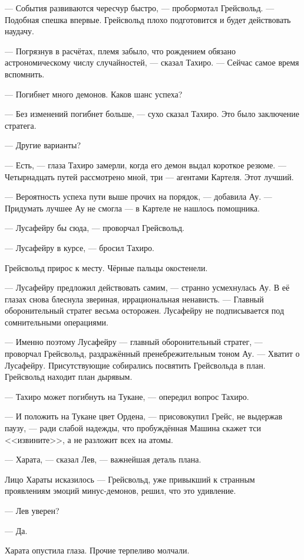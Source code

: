 --- События развиваются чересчур быстро, --- пробормотал Грейсвольд.
--- Подобная спешка впервые.
Грейсвольд плохо подготовится и будет действовать наудачу.

--- Погрязнув в расчётах, племя забыло, что рождением обязано астрономическому числу случайностей, --- сказал Тахиро.
--- Сейчас самое время вспомнить.

--- Погибнет много демонов.
Каков шанс успеха?

--- Без изменений погибнет больше, --- сухо сказал Тахиро.
Это было заключение стратега.

--- Другие варианты?

--- Есть, --- глаза Тахиро замерли, когда его демон выдал короткое резюме.
--- Четырнадцать путей рассмотрено мной, три --- агентами Картеля.
Этот лучший.

--- Вероятность успеха пути выше прочих на порядок, --- добавила Ау.
--- Придумать лучшее Ау не смогла --- в Картеле не нашлось помощника.

--- Лусафейру бы сюда, --- проворчал Грейсвольд.

--- Лусафейру в курсе, --- бросил Тахиро.

Грейсвольд прирос к месту.
Чёрные пальцы окостенели.

--- Лусафейру предложил действовать самим, --- странно усмехнулась Ау.
В её глазах снова блеснула звериная, иррациональная ненависть.
--- Главный оборонительный стратег весьма осторожен.
Лусафейру не подписывается под сомнительными операциями.

--- Именно поэтому Лусафейру --- главный оборонительный стратег, --- проворчал Грейсвольд, раздражённый пренебрежительным тоном Ау.
--- Хватит о Лусафейру.
Присутствующие собирались посвятить Грейсвольда в план.
Грейсвольд находит план дырявым.

--- Тахиро может погибнуть на Тукане, --- опередил вопрос Тахиро.

--- И положить на Тукане цвет Ордена, --- присовокупил Грейс, не выдержав паузу, --- ради слабой надежды, что пробуждённая Машина скажет тси <<извините>>, а не разложит всех на атомы.

--- Харата, --- сказал Лев, --- важнейшая деталь плана.

Лицо Хараты исказилось --- Грейсвольд, уже привыкший к странным проявлениям эмоций минус-демонов, решил, что это удивление.

--- Лев уверен?

--- Да.

Харата опустила глаза.
Прочие терпеливо молчали.

